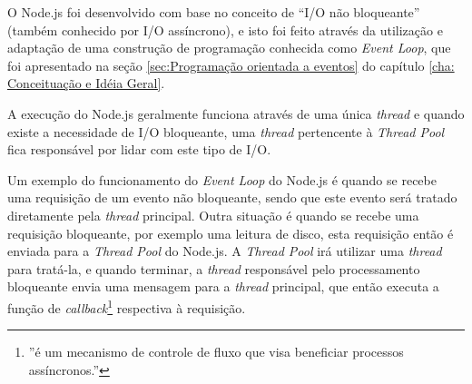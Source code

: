 \begin{description}
O Node.js foi desenvolvido com base no conceito de ``I/O não bloqueante''\nocite{nodeRight}  (também conhecido por I/O assíncrono), e isto foi feito através da utilização e adaptação de uma construção  de programação conhecida como \textit{Event Loop}, que foi apresentado na seção \ref{sec:Programação orientada a eventos} do capítulo \ref{cha: Conceituação e Idéia Geral}.

A execução do Node.js geralmente funciona através de uma única \textit{thread} e quando existe a necessidade de I/O bloqueante, uma \textit{thread} pertencente à \textit{Thread Pool} fica responsável por lidar com este tipo de I/O.  

Um exemplo do funcionamento do \textit{Event Loop} do Node.js é quando se recebe uma requisição de um evento não bloqueante, sendo que este evento será tratado diretamente pela \textit{thread} principal. Outra situação é quando se recebe uma requisição bloqueante, por exemplo uma leitura de disco, esta requisição então é enviada para a \textit{Thread Pool} do Node.js. A \textit{Thread Pool} irá utilizar uma \textit{thread} para tratá-la, e quando terminar, a \textit{thread} responsável pelo processamento bloqueante envia uma mensagem para a \textit{thread} principal, que então executa a função de \textit{callback}\footnote{''é um mecanismo de controle de fluxo que visa beneficiar processos assíncronos.''\cite{StackOCallbk}} respectiva à requisição.
    
\end{description}

